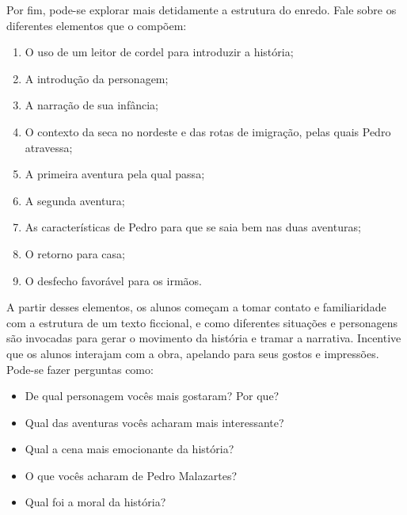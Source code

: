\documentclass[11pt]{extarticle}
\begin{document}
Por fim, pode-se explorar mais detidamente a estrutura do enredo. Fale sobre os diferentes elementos que o compõem:

\begin{enumerate}
\item O uso de um leitor de cordel para introduzir a história;

\item A introdução da personagem;

\item A narração de sua infância;

\item O contexto da seca no nordeste e das rotas de imigração, pelas quais Pedro atravessa;

\item A primeira aventura pela qual passa;

\item A segunda aventura;

\item As características de Pedro para que se saia bem nas duas aventuras;

\item O retorno para casa;

\item O desfecho favorável para os irmãos.
\end{enumerate}

A partir desses elementos, os alunos começam a tomar contato e familiaridade com a estrutura de um texto ficcional, e como diferentes situações e personagens são invocadas para gerar o movimento da história e tramar a narrativa. Incentive que os alunos interajam com a obra, apelando para seus gostos e impressões.
Pode-se fazer perguntas como:

\begin{itemize}
\item De qual personagem vocês mais gostaram? Por que?

\item Qual das aventuras vocês acharam mais interessante?

\item Qual a cena mais emocionante da história?

\item O que vocês acharam de Pedro Malazartes?

\item Qual foi a moral da história?

\end{itemize}
\end{document}

